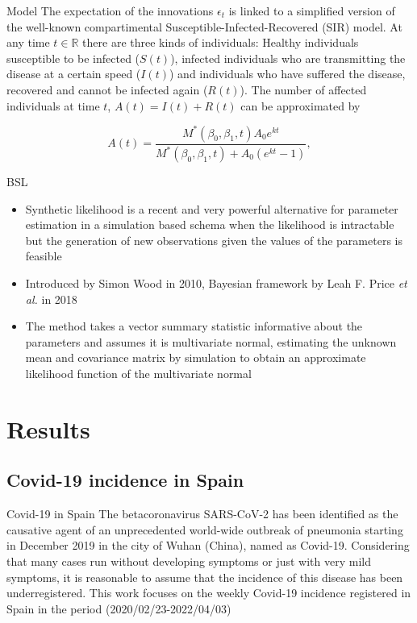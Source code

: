 \documentclass[aspectratio=169,usepdftitle=true]{beamer}
\begin{document}
\begin{frame}{Model}
The expectation of the innovations $\epsilon_t$ is linked to a simplified version of the well-known compartimental Susceptible-Infected-Recovered (SIR) model. At any time $t \in \mathbb{R}$ there are three kinds of individuals: Healthy individuals susceptible to be infected ($S(t)$), infected individuals who are transmitting the disease at a certain speed ($I(t)$) and individuals who have suffered the disease, recovered and cannot be infected again ($R(t)$). The number of affected individuals at time $t$, $A(t) = I(t) + R(t)$ can be approximated by

\begin{equation}\label{eq:SIR}
    A(t) = \frac{M^{*}(\beta_0, \beta_1, t) A_0 e^{kt}}{M^{*}(\beta_0, \beta_1, t)+A_0(e^{kt}-1)},
\end{equation}
\end{frame}

\begin{frame}{BSL}
\begin{itemize}
 \item Synthetic likelihood is a recent and very powerful alternative for parameter estimation in a simulation based schema when the likelihood is intractable but the generation of new observations given the values of the parameters is feasible
 \item Introduced by Simon Wood in 2010, Bayesian framework by Leah F. Price \textit{et al.} in 2018
 \item The method takes a vector summary statistic informative about the parameters and assumes it is multivariate normal, estimating the unknown mean and covariance matrix by simulation to obtain an approximate likelihood function of the multivariate normal
\end{itemize}
\end{frame}

\section{Results}
\subsection{Covid-19 incidence in Spain}
\begin{frame}{Covid-19 in Spain}
The betacoronavirus SARS-CoV-2 has been identified as the causative agent of an unprecedented world-wide outbreak of pneumonia starting in December 2019 in the city of Wuhan (China), named as Covid-19. Considering that many cases run without developing symptoms or just with very mild symptoms, it is reasonable to assume that the incidence of this disease has been underregistered. This work focuses on the weekly Covid-19 incidence registered in Spain in the period (2020/02/23-2022/04/03) 
\end{frame}
\end{document}

